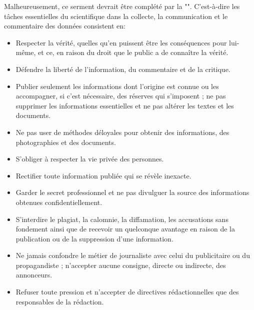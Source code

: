 	Malheureusement, ce serment devrait être compl\'et\'e par la "". C'est-à-dire les tâches essentielles du scientifique dans la collecte, la communication et le commentaire des donn\'ees consistent en:
\begin{itemize}
	\item Respecter la v\'erit\'e, quelles qu’en puissent être les cons\'equences pour lui-même, et ce, en raison du droit que le public a de connaître la v\'erit\'e.

	\item D\'efendre la libert\'e de l’information, du commentaire et de la critique.

	\item Publier seulement les informations dont l’origine est connue ou les accompagner, si c’est n\'ecessaire, des r\'eserves qui s’imposent ; ne pas supprimer les informations essentielles et ne pas alt\'erer les textes et les documents.

	\item Ne pas user de m\'ethodes d\'eloyales pour obtenir des informations, des photographies et des documents.

	\item S'obliger à respecter la vie priv\'ee des personnes.

	\item Rectifier toute information publi\'ee qui se r\'evèle inexacte.

	\item Garder le secret professionnel et ne pas divulguer la source des informations obtenues confidentiellement.

	\item S'interdire le plagiat, la calomnie, la diffamation, les accusations sans fondement ainsi que de recevoir un quelconque avantage en raison de la publication ou de la suppression d'une information.

	\item Ne jamais confondre le m\'etier de journaliste avec celui du publicitaire ou du propagandiste ; n’accepter aucune consigne, directe ou indirecte, des annonceurs.

	\item Refuser toute pression et n’accepter de directives r\'edactionnelles que des responsables de la r\'edaction.
\end{itemize}

